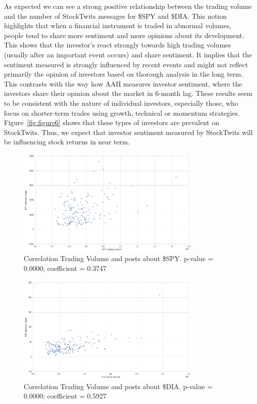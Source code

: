 As expected we can see a strong positive relationship between the trading volume and the number of StockTwits messages for \$SPY and \$DIA. This notion highlights that when a financial instrument is traded in abnormal volumes, people tend to share more sentiment and more opinions about its development. This shows that the investor's react strongly towards high trading volumes (usually after an important event occurs) and share sentiment. It implies that the sentiment measured is strongly influenced by recent events and might not reflect primarily the opinion of investors based on thorough analysis in the long term. This contrasts with the way how AAII measures investor sentiment, where the investors share their opinion about the market in 6-month lag. These results seem to be consistent with the nature of individual investors, especially those, who focus on shorter-term trades using growth, technical or momentum strategies. Figure~\ref{fig:figure6} shows that these types of investors are prevalent on StockTwits. Thus, we expect that investor sentiment measured by StockTwits will be influencing stock returns in near term.

\newpage

\begin{figure}[h]
\centering
\includegraphics[width=0.8\textwidth]{figures/figure7.png}
\caption{\label{fig:figure7}Correlation Trading Volume and posts about \$SPY. p-value = 0.0000; coefficient =  0.3747 }
\end{figure}

\begin{figure}[h]
\centering
\includegraphics[width=0.8\textwidth]{figures/figure8.png}
\caption{\label{fig:figure8}Correlation Trading Volume and posts about \$DIA. p-value = 0.0000; coefficient = 0.5927}
\end{figure}

